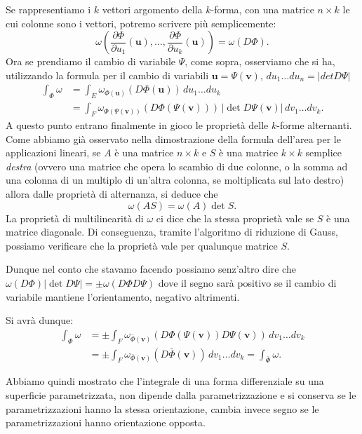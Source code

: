 \documentclass[italian,a4paper]{scrartcl}
\renewcommand{\vec}{\mathbf}
\begin{document}
Se rappresentiamo i $k$ vettori argomento della $k$-forma, con una
matrice $n\times k$ le cui colonne sono i vettori, potremo scrivere
più semplicemente:
\[
  \omega\left(\frac{\partial
  \Phi}{\partial u_1}(\vec u), \dots, \frac{\partial \Phi}{\partial
    u_k}(\vec u)\right)
   = \omega(D\Phi).
\]
Ora se prendiamo il cambio di variabile $\Psi$, come sopra, osserviamo
che si ha, utilizzando la formula per il cambio di variabili $\vec u
= \Psi(\vec v)$, $du_1 \dots du_n = \lvert det D\Psi\rvert$
\begin{align*}
 \int_{\Phi} \omega & = \int_E \omega_{\Phi(\vec u)}(D\Phi(\vec u))\, du_1\dots du_k\\
 &= \int_F \omega_{\Phi(\Psi(\vec v))}(D\Phi(\Psi(\vec v)))\, \lvert
 \det D\Psi(\vec v)\rvert\, dv_1 \dots dv_k.
\end{align*}
A questo punto entrano finalmente in gioco le proprietà delle
$k$-forme alternanti. Come abbiamo già osservato nella dimostrazione
della formula dell'area per le applicazioni lineari, se $A$ è una
matrice $n\times k$ e $S$ è una
matrice $k\times k$ semplice \emph{destra} (ovvero una matrice che opera lo scambio di due
colonne, o la somma ad una colonna di un multiplo di un'altra colonna,
se moltiplicata sul lato destro)
allora dalle proprietà di alternanza, si deduce che
\[
  \omega(A S) = \omega(A)\det S.
\]
La proprietà di multilinearità di $\omega$ ci dice che
la stessa proprietà vale se $S$ è una matrice diagonale. Di
conseguenza, tramite l'algoritmo di riduzione di Gauss, possiamo
verificare che la proprietà vale per qualunque matrice $S$. 

Dunque nel conto che stavamo facendo possiamo senz'altro dire che
$\omega(D\Phi)\lvert \det D\Psi\rvert = \pm \omega(D\Phi D\Psi)$ dove
il segno sarà positivo se il cambio di variabile mantiene
l'orientamento, negativo altrimenti. 

Si avrà dunque:
\begin{align*}
\int_\Phi \omega 
&= \pm \int_F \omega_{\bar \Phi(\vec v)} (D\Phi(\Psi(\vec
v))D\Psi(\vec v))\, dv_1\dots dv_k \\
& = \pm \int_F \omega_{\bar \Phi(\vec v)} (D\bar \Phi(\vec v))\,
dv_1\dots dv_k 
= \int_{\bar \Phi} \omega.
\end{align*}

Abbiamo quindi mostrato che l'integrale di una forma differenziale su
una superficie parametrizzata, non dipende dalla parametrizzazione e
si conserva se le parametrizzazioni hanno la stessa orientazione,
cambia invece segno se le parametrizzazioni hanno orientazione opposta.
\end{document}
